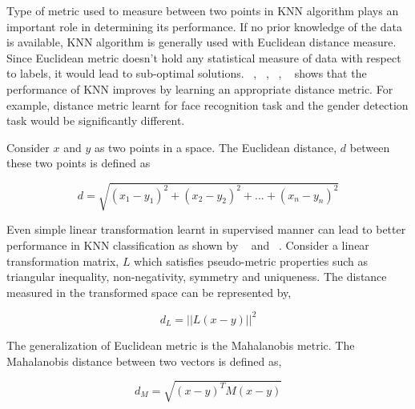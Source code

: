%
%
% 

Type of metric used to measure between two points in KNN algorithm plays an important role 
in determining its performance. If no prior knowledge of the data is available, KNN algorithm
is generally used with Euclidean distance measure. Since Euclidean metric doesn't hold any
statistical measure of data with respect to labels, it would lead to sub-optimal solutions.
~\cite{Chopra:2005:LSM:1068507.1068961}, ~\cite{NIPS2004_2566}, ~\cite{Shalev-Shwartz:2004:OBL:1015330.1015376}, 
~\cite{Shental:2002:ALR:645318.649268} shows that the performance of KNN improves by 
learning an appropriate distance metric. For example, distance metric learnt for face recognition
task and the gender detection task would be significantly different.

Consider $x$ and $y$ as two points in a space. The Euclidean distance, $d$ between these two points is
defined as

\begin{equation}
    d = \sqrt{(x_1-y_1)^2 + (x_2-y_2)^2 + . . . + (x_n-y_n)^2} 
\end{equation}

Even simple linear transformation learnt in supervised manner can lead to better performance in KNN 
classification as shown by ~\cite{Shalev-Shwartz:2004:OBL:1015330.1015376} and ~\cite{NIPS2004_2566}.
Consider a linear transformation matrix, $L$ which satisfies pseudo-metric properties such as triangular 
inequality, non-negativity, symmetry and uniqueness. The distance measured in the transformed space 
can be represented by,

\begin{equation}
    d_L = || L(x - y) ||^2
\end{equation}

The generalization of Euclidean metric is the Mahalanobis metric. The Mahalanobis distance between two
vectors is defined as,

\begin{equation}
    d_M = \sqrt{ (x-y)^T M (x-y) }
\end{equation}

